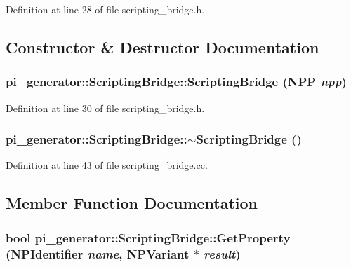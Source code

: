 Definition at line 28 of file scripting\_\-bridge.h.



\subsection{Constructor \& Destructor Documentation}
\hypertarget{classpi__generator_1_1_scripting_bridge_abcc778b6a4c482dff1ed271d7e776e42}{
\subsubsection[{ScriptingBridge}]{\setlength{\rightskip}{0pt plus 5cm}pi\_\-generator::ScriptingBridge::ScriptingBridge ({\bf NPP} {\em npp})}}
\label{classpi__generator_1_1_scripting_bridge_abcc778b6a4c482dff1ed271d7e776e42}


Definition at line 30 of file scripting\_\-bridge.h.

\hypertarget{classpi__generator_1_1_scripting_bridge_a605567080f40ddb9a6c2fa4ea9f2e876}{
\subsubsection[{$\sim$ScriptingBridge}]{\setlength{\rightskip}{0pt plus 5cm}pi\_\-generator::ScriptingBridge::$\sim$ScriptingBridge ()}}
\label{classpi__generator_1_1_scripting_bridge_a605567080f40ddb9a6c2fa4ea9f2e876}


Definition at line 43 of file scripting\_\-bridge.cc.



\subsection{Member Function Documentation}
\hypertarget{classpi__generator_1_1_scripting_bridge_ab97693ce171c216783e79debb3b192cc}{
\subsubsection[{GetProperty}]{\setlength{\rightskip}{0pt plus 5cm}bool pi\_\-generator::ScriptingBridge::GetProperty ({\bf NPIdentifier} {\em name}, \/  {\bf NPVariant} $\ast$ {\em result})}}
\label{classpi__generator_1_1_scripting_bridge_ab97693ce171c216783e79debb3b192cc}


